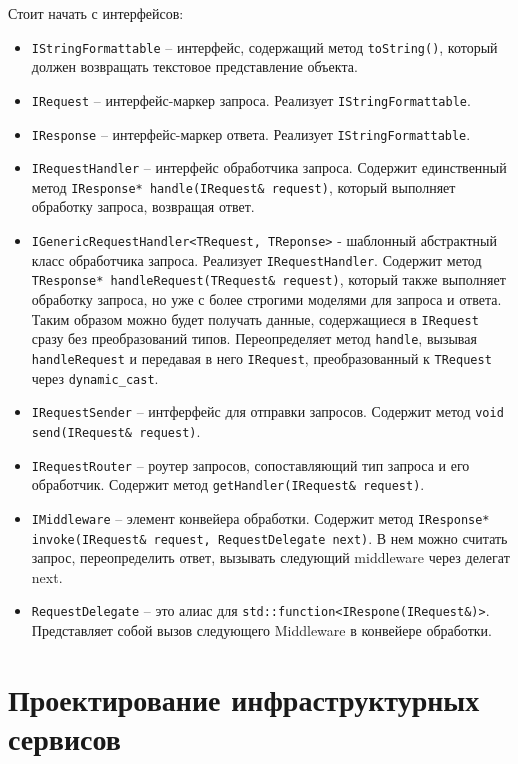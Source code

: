 Стоит начать с интерфейсов:
\begin{itemize}
	\item \verb|IStringFormattable| – интерфейс, содержащий метод \verb|toString()|, который должен возвращать текстовое представление объекта.
	\item \verb|IRequest| – интерфейс-маркер запроса. Реализует \verb|IStringFormattable|.
	\item \verb|IResponse| – интерфейс-маркер ответа. Реализует \verb|IStringFormattable|.
	\item \verb|IRequestHandler| – интерфейс обработчика запроса. Содержит единственный метод \verb|IResponse* handle(IRequest& request)|, который выполняет обработку запроса, возвращая ответ.
	\item \verb|IGenericRequestHandler<TRequest, TReponse>| - шаблонный абстрактный класс обработчика запроса. Реализует \verb|IRequestHandler|. Содержит метод \verb|TResponse* handleRequest(TRequest& request)|, который также выполняет обработку запроса, но уже с более строгими моделями для запроса и ответа. Таким образом можно будет получать данные, содержащиеся в \verb|IRequest| сразу без преобразований типов. Переопределяет метод \verb|handle|, вызывая \verb|handleRequest| и передавая в него \verb|IRequest|, преобразованный к \verb|TRequest| через \verb|dynamic_cast|.
	\item \verb|IRequestSender| – интферфейс для отправки запросов. Содержит метод \verb|void send(IRequest& request)|.
	\item \verb|IRequestRouter| – роутер запросов, сопоставляющий тип запроса и его обработчик. Содержит метод \verb|getHandler(IRequest& request)|.
	\item \verb|IMiddleware| – элемент конвейера обработки. Содержит метод 
	\verb|IResponse* invoke(IRequest& request, RequestDelegate next)|. В нем можно считать запрос, переопределить ответ, вызывать следующий middleware через делегат next.
	\item \verb|RequestDelegate| – это алиас для \verb|std::function<IRespone(IRequest&)>|. Представляет собой вызов следующего Middleware в конвейере обработки.
\end{itemize}

\section{Проектирование инфраструктурных сервисов} \label{ch1:conclusion4}

